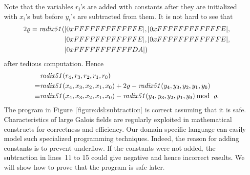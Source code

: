 Note that the variables ${r}_i$'s are added with constants after they are initialized with ${x}_i$'s but before ${y}_i$'s are subtracted from them.
It is not hard to see that
\[
\begin{aligned}
2\varrho = \mathit{radix51} (&|0xFFFFFFFFFFFFE|, |0xFFFFFFFFFFFFE|, \\
          & |0xFFFFFFFFFFFFE|, |0xFFFFFFFFFFFFE|, \\
          & |0xFFFFFFFFFFFDA|)
\end{aligned}
\]
after tedious computation.
Hence
\[
\begin{aligned}
  & \mathit{radix51}({r}_4, {r}_3, {r}_2, {r}_1, {r}_0) \\
= & \mathit{radix51}({x}_4, {x}_3, {x}_2, {x}_1, {x}_0) + 2 \varrho - \mathit{radix51}({y}_4, {y}_3, {y}_2, {y}_1, {y}_0) \\
\equiv & \mathit{radix51}({x}_4, {x}_3, {x}_2, {x}_1, {x}_0) - \mathit{radix51}({y}_4, {y}_3, {y}_2, {y}_1, {y}_0) \mathbin{\textmd{mod}}\ \varrho.
\end{aligned}
\]
The program in Figure~\ref{figure:dsl:subtraction} is correct assuming that it is safe.
Characteristics of large Galois fields are regularly exploited in mathematical constructs for correctness and efficiency.
Our domain specific language can easily model such specialized programming techniques.
Indeed, the reason for adding constants is to prevent underflow.
If the constants were not added, the subtraction in lines~11 to 15 could give negative and hence incorrect results.
We will show how to prove that the program is safe later.

